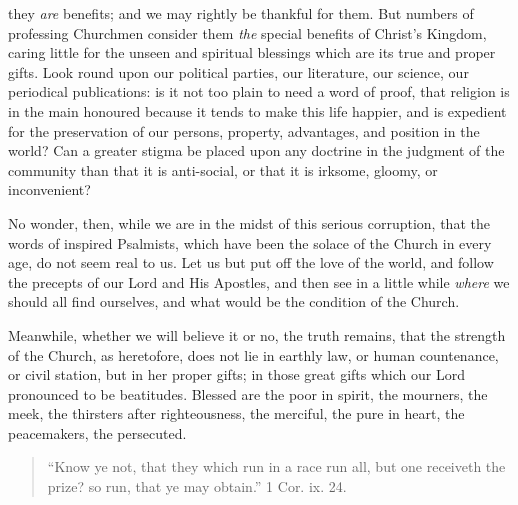 they \emph{are} benefits; and we may rightly be thankful for them. But
numbers of professing Churchmen consider them \emph{the} special
benefits of Christ's Kingdom, caring little for the unseen and
spiritual blessings which are its true and proper gifts. Look round
upon our political parties, our literature, our science, our
periodical publications: is it not too plain to need a word of proof,
that religion is in the main honoured because it tends to make this
life happier, and is expedient for the preservation of our persons,
property, advantages, and position in the world? Can a greater stigma
be placed upon any doctrine in the judgment of the community than that
it is anti-social, or that it is irksome, gloomy, or inconvenient?

No wonder, then, while we are in the midst of this serious
corruption, that the words of inspired Psalmists, which have been the
solace of the Church in every age, do not seem real to us. Let us but
put off the love of the world, and follow the precepts of our Lord and
His Apostles, and then see in a little while \emph{where} we should
all find ourselves, and what would be the condition of the Church.

Meanwhile, whether we will believe it or no, the truth remains,
that the strength of the Church, as heretofore, does not lie in
earthly law, or human countenance, or civil station, but in her proper
gifts; in those great gifts which our Lord pronounced to be
beatitudes. Blessed are the poor in spirit, the mourners, the meek,
the thirsters after righteousness, the merciful, the pure in heart,
the peacemakers, the persecuted.


\begin{quote}

``Know ye not, that they which run in a race run all, but one
receiveth the prize? so run, that ye may obtain.'' 1 Cor. ix.
24.

\end{quote}

